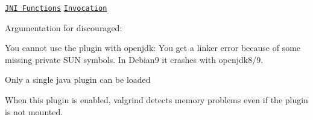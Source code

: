 \href{https://docs.oracle.com/javase/7/docs/technotes/guides/jni/spec/functions.html}{\tt J\+NI Functions} \href{https://docs.oracle.com/javase/7/docs/technotes/guides/jni/spec/invocation.html}{\tt Invocation}

Argumentation for discouraged\+:


\begin{DoxyItemize}
\item You cannot use the plugin with openjdk\+: You get a linker error because of some missing private S\+UN symbols. In Debian9 it crashes with openjdk8/9.
\item Only a single java plugin can be loaded
\item When this plugin is enabled, valgrind detects memory problems even if the plugin is not mounted. 
\end{DoxyItemize}
